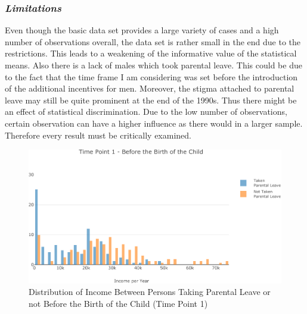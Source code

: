 \documentclass[
  12pt,
]{article}
\begin{document}
\hypertarget{limitations}{%
\subsubsection*{\texorpdfstring{\emph{Limitations}}{Limitations}}\label{limitations}}

Even though the basic data set provides a large variety of cases and a high number of observations overall, the data set is rather small in the end due to the restrictions. This leads to a weakening of the informative value of the statistical means. Also there is a lack of males which took parental leave. This could be due to the fact that the time frame I am considering was set before the introduction of the additional incentives for men. Moreover, the stigma attached to parental leave may still be quite prominent at the end of the 1990s.
Thus there might be an effect of statistical discrimination.
Due to the low number of observations, certain observation can have a higher influence as there would in a larger sample. Therefore every result must be critically examined.

\begin{figure}

{\centering \includegraphics{Parental_Leave-Finalizing-Data-Set_files/figure-latex/fig-1-1} 

}

\caption{Distribution of Income Between Persons Taking Parental Leave or not Before the Birth of the Child (Time Point 1)}\label{fig:fig-1}
\end{figure}
\end{document}
